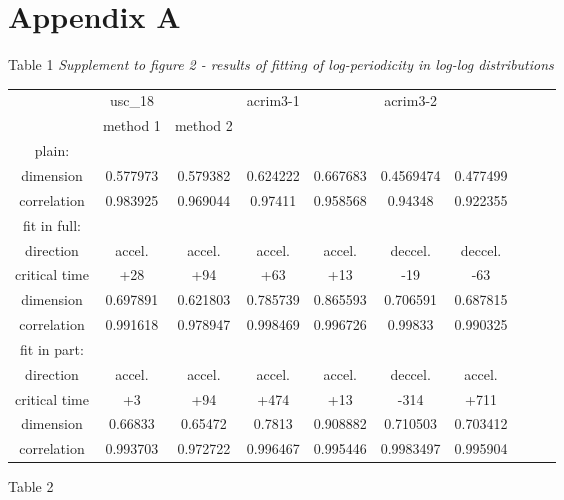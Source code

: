 \documentclass[a4paper]{article}
\begin{document}
\newpage
\section*{Appendix A}

Table 1 \textit{Supplement to figure 2 - results of fitting of log-periodicity in log-log distributions}
\vskip 12pt

{\small{

\begin{tabular}{cccccccccc}
\hline
             & usc\_18        &           & acrim3-1  &           & acrim3-2   &           \\
             & method 1       & method 2  &           &           &            &           \\
\hline
plain: \\
dimension     & 0.577973      & 0.579382  & 0.624222  & 0.667683  & 0.4569474  & 0.477499  \\
correlation   & 0.983925      & 0.969044  & 0.97411   & 0.958568  & 0.94348    & 0.922355  \\
\hline
fit in full: \\ 
direction     & accel.        & accel.    & accel.    & accel.    & deccel.    & deccel.   \\
critical time & +28           & +94       & +63       & +13       & -19        & -63       \\
dimension     & 0.697891      & 0.621803  & 0.785739  & 0.865593  & 0.706591   & 0.687815 \\
correlation   & 0.991618      & 0.978947  & 0.998469  & 0.996726  & 0.99833    & 0.990325 \\
\hline
fit in part: \\
direction     & accel.        & accel.    & accel.    & accel.    & deccel.   & accel.    \\
critical time & +3            & +94       & +474      & +13       & -314      & +711      \\
dimension     & 0.66833       & 0.65472   & 0.7813    & 0.908882  & 0.710503  & 0.703412  \\
correlation   & 0.993703      & 0.972722  & 0.996467  & 0.995446  & 0.9983497 & 0.995904  \\
\hline
\end{tabular}

}}


\vskip 12pt

Table 2 \textit{}
\end{document}
